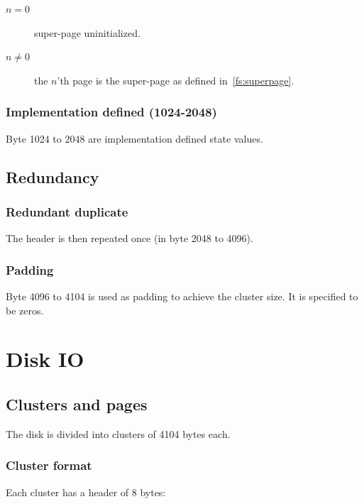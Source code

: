 \documentclass[11pt,a4paper]{report}
\newcommand{\clustersize}{4104 }
\begin{document}
        \begin{description}
            \item [$n = 0$]    super-page uninitialized.
            \item [$n \neq 0$] the $n$'th page is the super-page as
                defined in~\ref{fs:superpage}.
        \end{description}

        \subsection{Implementation defined (1024-2048)}
        Byte 1024 to 2048 are implementation defined state values.

    \section{Redundancy}
    \label{section:redundant}
        \subsection{Redundant duplicate}
        The header is then repeated once (in byte 2048 to 4096).

        \subsection{Padding}
        Byte 4096 to \clustersize is used as padding to achieve the cluster
        size. It is specified to be zeros.

    \chapter{Disk IO}

    \section{Clusters and pages}
        The disk is divided into clusters of \clustersize bytes each.

        \subsection{Cluster format}
        Each cluster has a header of 8 bytes:
\end{document}
